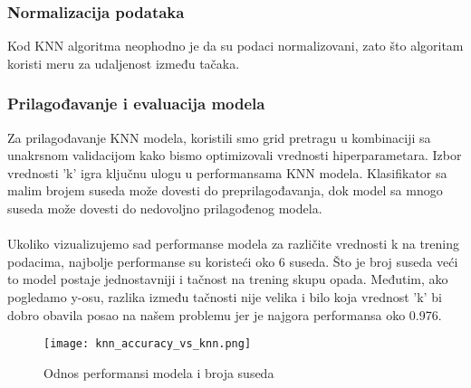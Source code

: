 \documentclass[a4paper,12pt]{article}
\begin{document}
\subsubsection{Normalizacija podataka}
Kod KNN algoritma neophodno je da su podaci normalizovani, zato što algoritam koristi meru za udaljenost između tačaka.

\subsubsection{Prilagođavanje i evaluacija modela}
Za prilagođavanje KNN modela, koristili smo grid pretragu u kombinaciji sa unakrsnom validacijom kako bismo optimizovali vrednosti hiperparametara. Izbor vrednosti 'k' igra ključnu ulogu u performansama KNN modela. Klasifikator sa malim brojem suseda može dovesti do preprilagođavanja, dok model sa mnogo suseda može dovesti do nedovoljno prilagođenog modela.
\\\\Ukoliko vizualizujemo sad performanse modela za različite vrednosti k na trening podacima, najbolje performanse su koristeći oko 6 suseda. Što je broj suseda veći to model postaje jednostavniji i tačnost na trening skupu opada. Međutim, ako pogledamo y-osu, razlika između tačnosti nije velika i bilo koja vrednost 'k' bi dobro obavila posao na našem problemu jer je najgora performansa oko 0.976.

\begin{figure}[H]
\centering
\texttt{[image: knn\_accuracy\_vs\_knn.png]}
\caption{Odnos performansi modela i broja suseda}
\label{fig:knn_accuracy_vs_knn}
\end{figure}
\end{document}
